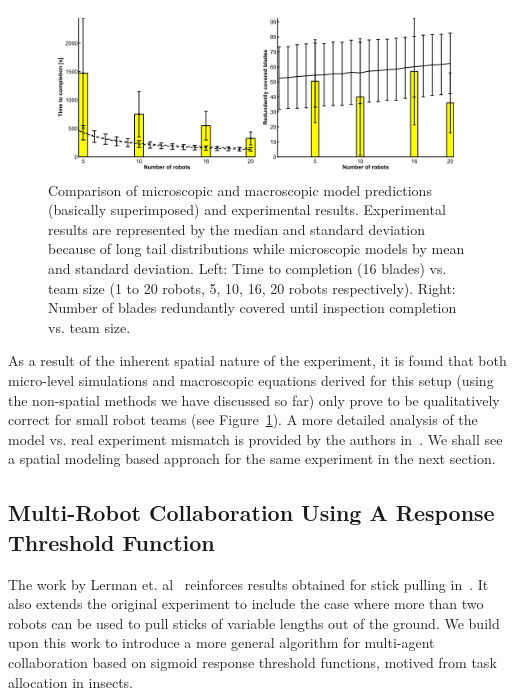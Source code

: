 \documentclass[Main.tex]{subfiles}
\begin{document}
\begin{figure}[!htb]
\centering\includegraphics[width=.75\textwidth]{bladeRes.png}
\caption{Comparison of microscopic and macroscopic model predictions (basically superimposed) and experimental results. Experimental results are represented by the median and standard deviation because of long tail distributions while microscopic models by mean and standard deviation. Left: Time to completion (16 blades) vs. team size (1 to 20 robots, 5, 10, 16, 20 robots respectively). Right: Number of blades redundantly covered until inspection completion vs. team size.}\label{fig:bladeres}
\end{figure}

As a result of the inherent spatial nature of the experiment, it is found that both micro-level simulations and macroscopic equations derived for this setup (using the non-spatial methods we have discussed so far) only prove to be qualitatively correct for small robot teams (see Figure~\ref{fig:bladeres}). A more detailed analysis of the model vs. real experiment mismatch is provided by the authors in~\cite{Correll2006, Correll2008a}. We shall see a spatial modeling based approach for the same experiment in the next section.

\subsection{Multi-Robot Collaboration Using A Response Threshold Function}

The work by Lerman et. al~\cite{Lerman2001} reinforces results obtained for stick pulling in~\cite{Ijspeert2001, Martinoli1999, Martinoli1999a}. It also extends the original experiment to include the case where more than two robots can be used to pull sticks of variable lengths out of the ground. We build upon this work to introduce a more general algorithm for multi-agent collaboration based on sigmoid response threshold functions, motived from task allocation in insects.
\end{document}
